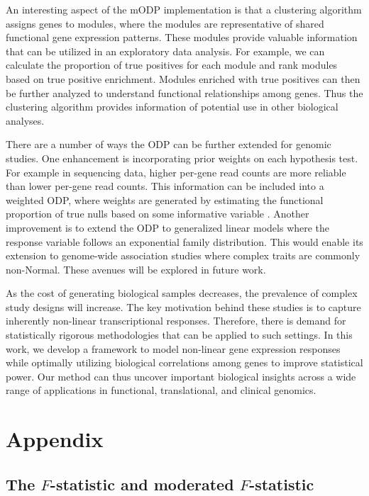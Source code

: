 \documentclass[11pt]{article}
\begin{document}
An interesting aspect of the mODP implementation is that a clustering algorithm assigns genes to modules, where the modules are representative of shared functional gene expression patterns. These modules provide valuable information that can be utilized in an exploratory data analysis. For example, we can calculate the proportion of true positives for each module and rank modules based on true positive enrichment. Modules enriched with true positives can then be further analyzed to understand functional relationships among genes. Thus the clustering algorithm provides information of potential use in other biological analyses.

There are a number of ways the ODP can be further extended for genomic studies. One enhancement is incorporating prior weights on each hypothesis test. For example in sequencing data, higher per-gene read counts are more reliable than lower per-gene read counts. This information can be included into a weighted ODP, where weights are generated by estimating the functional proportion of true nulls based on some informative variable \cite{chen2017}. Another improvement is to extend the ODP to generalized linear models where the response variable follows an exponential family distribution. This would enable its extension to genome-wide association studies where complex traits are commonly non-Normal. These avenues will be explored in future work.

As the cost of generating biological samples decreases, the prevalence of complex study designs will increase. The key motivation behind these studies is to capture inherently non-linear transcriptional responses. Therefore, there is demand for statistically rigorous methodologies that can be applied to such settings. In this work, we develop a framework to model non-linear gene expression responses while optimally utilizing biological correlations among genes to improve statistical power. Our method can thus uncover important biological insights across a wide range of applications in functional, translational, and clinical genomics.

\section{Appendix\label{Sec:appendix}}

\subsection{The $F$-statistic and moderated $F$-statistic\label{Subsec:ftest}}
\end{document}
